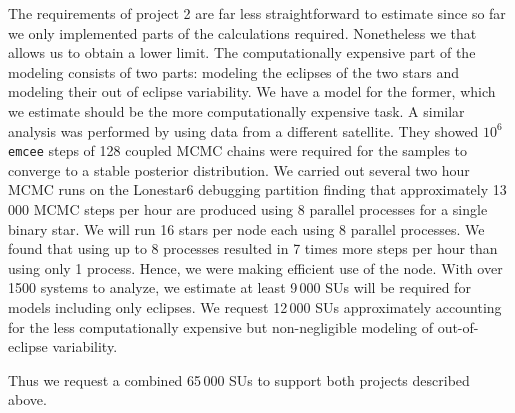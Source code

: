 \documentclass{article}
\begin{document}
The requirements of project 2 are far less straightforward to estimate since so
far we only implemented parts of the calculations required. Nonetheless we that
allows us to obtain a lower limit. The computationally expensive part of the
modeling consists of two parts: modeling the eclipses of the two stars and
modeling their out of eclipse variability. We have a model for the former, which
we estimate should be the more computationally expensive task. A similar
analysis was performed by \citet{Windemuth_et_al_19} using data from a different
satellite. They showed $10^6$ \texttt{emcee} steps of 128 coupled MCMC chains
were required for the samples to converge to a stable posterior distribution. We
carried out several two hour MCMC runs on the Lonestar6 debugging partition
finding that approximately 13\,000 MCMC steps per hour are produced using 8
parallel processes for a single binary star. We will run 16 stars per node each
using 8 parallel processes. We found that using up to 8 processes resulted in 7
times more steps per hour than using only 1 process. Hence, we were making
efficient use of the node. With over 1500 systems to analyze, we estimate
at least 9\,000 SUs will be required for models including only eclipses. We
request 12\,000 SUs approximately accounting for the less computationally
expensive but non-negligible modeling of out-of-eclipse variability.

Thus we request a combined 65\,000 SUs to support both projects described above.

\section*{}




\end{document}
